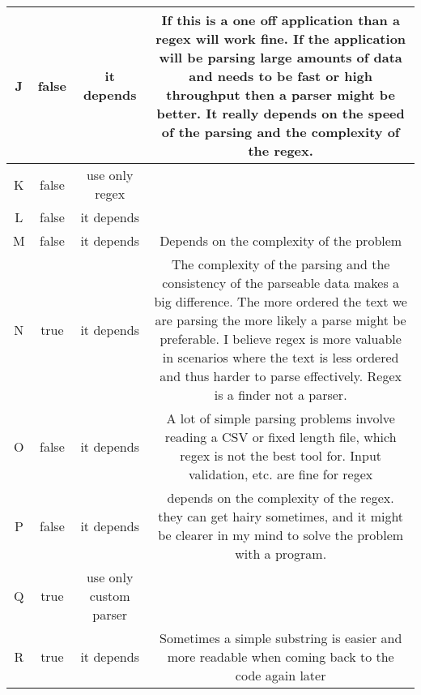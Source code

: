 \begin{table}[!htbp]
\begin{tabular}{|c|c|c|c|}
\hline
J & false & it depends &\begin{minipage}{3.6in} If this is a one off application than a regex will work fine. If the application will be parsing large amounts of data and needs to be fast or high throughput then a parser might be better. It really depends on the speed of the parsing and the complexity of the regex.\end{minipage} \\
\hline
K & false & use only regex &\begin{minipage}{3.6in} \end{minipage} \\
\hline
L & false & it depends &\begin{minipage}{3.6in} \end{minipage} \\
\hline
M & false & it depends &\begin{minipage}{3.6in} Depends on the complexity of the problem\end{minipage} \\
\hline
N & true & it depends &\begin{minipage}{3.6in} The complexity of the parsing and the consistency of the parseable data makes a big difference. The more ordered the text we are parsing the more likely a parse might be preferable. I believe regex is more valuable in scenarios where the text is less ordered and thus harder to parse effectively. Regex is a finder not a parser.\end{minipage} \\
\hline
O & false & it depends &\begin{minipage}{3.6in} A lot of simple parsing problems involve reading a CSV or fixed length file, which regex is not the best tool for. Input validation, etc. are fine for regex\end{minipage} \\
\hline
P & false & it depends &\begin{minipage}{3.6in} depends on the complexity of the regex. they can get hairy sometimes, and it might be clearer in my mind to solve the problem with a program.\end{minipage} \\
\hline
Q & true & use only custom parser &\begin{minipage}{3.6in} \end{minipage} \\
\hline
R & true & it depends &\begin{minipage}{3.6in} Sometimes a simple substring is easier and more readable when coming back to the code again later\end{minipage} \\

\end{tabular}
\end{table}
